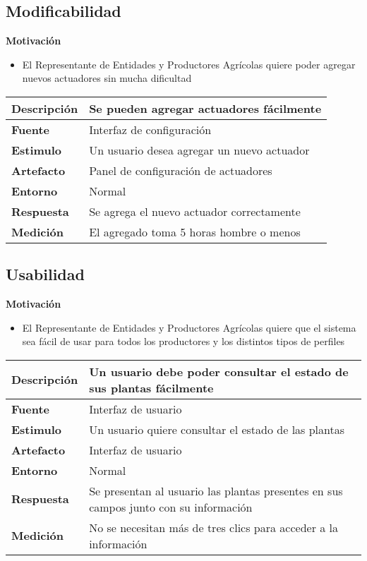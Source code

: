 \subsection{Modificabilidad}
\textbf{Motivación}
\begin{itemize}
 \item El Representante de Entidades y Productores Agr\'icolas quiere poder agregar nuevos actuadores sin mucha dificultad
\end{itemize}

\begin{tabular}{| l || p{12cm} |}
\hline 
\textbf{Descripci\'on} & Se pueden agregar actuadores fácilmente \\
\hline 
\textbf{Fuente} & Interfaz de configuración \\
\hline 
\textbf{Estimulo} & Un usuario desea agregar un nuevo actuador \\
\hline 
\textbf{Artefacto} & Panel de configuración de actuadores \\
\hline 
\textbf{Entorno} & Normal \\
\hline 
\textbf{Respuesta} & Se agrega el nuevo actuador correctamente \\
\hline 
\textbf{Medici\'on} & El agregado toma 5 horas hombre o menos \\
\hline 
\end{tabular}

\subsection{Usabilidad}
\textbf{Motivación}
\begin{itemize}
 \item El Representante de Entidades y Productores Agr\'icolas quiere que el sistema sea f\'acil de usar para todos los productores y los distintos tipos de perfiles
\end{itemize}

\begin{tabular}{| l || p{12cm} |}
\hline 
\textbf{Descripci\'on} & Un usuario debe poder consultar el estado de sus plantas fácilmente \\
\hline 
\textbf{Fuente} & Interfaz de usuario \\
\hline 
\textbf{Estimulo} & Un usuario quiere consultar el estado de las plantas \\
\hline 
\textbf{Artefacto} & Interfaz de usuario \\
\hline 
\textbf{Entorno} & Normal \\
\hline 
\textbf{Respuesta} & Se presentan al usuario las plantas presentes en sus campos junto con su información \\
\hline 
\textbf{Medici\'on} & No se necesitan más de tres clics para acceder a la información \\
\hline 
\end{tabular}